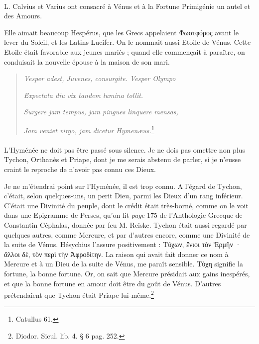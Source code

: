 \documentclass[a4paper, 18pt, oneside]{article}
\begin{document}
\paragraph{}
L. Calvius et Varius ont consacré à Vénus et à la Fortune Primigénie un autel et des Amours.

Elle aimait beaucoup Hespérus, que les Grecs appelaient Φωστφόρος avant le lever du Soleil, et les Latins Lucifer. On le nommait aussi Etoile de Vénus. Cette Etoile était favorable aux jeunes mariés ; quand elle commençait à paraître, on conduisait la nouvelle épouse à la maison de son mari.
\begin{quotation}
\emph{Vesper adest, Juvenes, consurgite. Vesper Olympo}

\emph{Expectata diu vix tandem lumina tollit.}

\emph{Surgere jam tempus, jam pingues linquere mensas,}

\emph{Jam veniet virgo, jam dicetur Hymenæus.}\footnote{Catullus 61.}
\end{quotation}
\paragraph{}
L'Hyménée ne doit pas être passé sous silence. Je ne dois pas omettre non plus Tychon, Orthanès et Priape, dont je me serais abstenu de parler, si je n'eusse craint le reproche de n'avoir pas connu ces Dieux.

Je ne m'étendrai point sur l'Hyménée, il est trop connu. A l'égard de Tychon, c'était, selon quelques-uns, un perit Dieu, parmi les Dieux d'un rang inférieur. C'était une Divinité du peuple, dont le crédit était très-borné, comme on le voit dans une Epigramme de Perses, qu'on lit \emph{page} 175 de l'Anthologie Grecque de Constantin Céphalas, donnée par feu M. Reiske. Tychon était aussi regardé par quelques autres, comme Mercure, et par d'autres encore, comme une Divinité de la suite de Vénus. Hésychius l'assure positivement : Τύχων, ἔνιοι τὸν Ἑρμῆν · ἄλλοι δὲ, τὸν περὶ τὴν Ἀφροδίτην. La raison qui avait fait donner ce nom à Mercure et à un Dieu de la suite de Vénus, me paraît sensible. Τύχη signifie la fortune, la bonne fortune. Or, on sait que Mercure présidait aux gains inespérés, et que la bonne fortune en amour doit être du goût de Vénus. D'autres prétendaient que Tychon était Priape lui-même.\footnote{Diodor. Sicul. lib. 4. § 6 pag. 252.}
\end{document}
